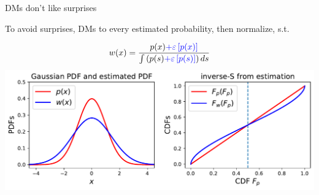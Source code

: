 
\begin{frame}{DMs don't like surprises}

To avoid surprises, DMs  to every estimated probability, then normalize, s.t.

$$w(x)=\frac{p(x)\textcolor{blue}{+\varepsilon\left[p(x)\right]}}{\int \left(p(s) \textcolor{blue}{+\varepsilon\left[p(s)\right]} \right)ds}$$
\pause
\centering
	\includegraphics[width=.9\textwidth]{../../figs/square_root_error_1Gaussian.pdf} \\
\end{frame}


